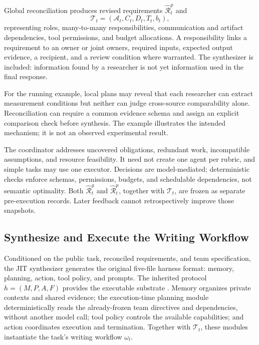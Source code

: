 \documentclass[11pt]{article}
\newcommand{\rub}{\widehat{\mathcal{R}}}
\newcommand{\team}{\mathcal{T}}
\begin{document}
Global reconciliation produces revised requirements $\rub_t^p$ and
\begin{equation}
\team_t=(\mathcal A_t,C_t,D_t,T_t,b_t),
\end{equation}
representing roles, many-to-many responsibilities, communication and artifact dependencies, tool permissions, and budget allocations. A responsibility links a requirement to an owner or joint owners, required inputs, expected output evidence, a recipient, and a review condition where warranted. The synthesizer is included: information found by a researcher is not yet information used in the final response.

For the running example, local plans may reveal that each researcher can extract measurement conditions but neither can judge cross-source comparability alone. Reconciliation can require a common evidence schema and assign an explicit comparison check before synthesis. The example illustrates the intended mechanism; it is not an observed experimental result.

The coordinator addresses uncovered obligations, redundant work, incompatible assumptions, and resource feasibility. It need not create one agent per rubric, and simple tasks may use one executor. Decisions are model-mediated; deterministic checks enforce schemas, permissions, budgets, and schedulable dependencies, not semantic optimality. Both $\rub_t^g$ and $\rub_t^p$, together with $\team_t$, are frozen as separate pre-execution records. Later feedback cannot retrospectively improve those snapshots.

\subsection{Synthesize and Execute the Writing Workflow}
\label{sec:execution}

Conditioned on the public task, reconciled requirements, and team specification, the JIT synthesizer generates the original five-file harness format: memory, planning, action, tool policy, and prompts. The inherited protocol $h=(M,P,A,F)$ provides the executable substrate \citep{zhang2026jit}. Memory organizes private contexts and shared evidence; the execution-time planning module deterministically reads the already-frozen team directives and dependencies, without another model call; tool policy controls the available capabilities; and action coordinates execution and termination. Together with $\team_t$, these modules instantiate the task's writing workflow $\omega_t$.
\end{document}
